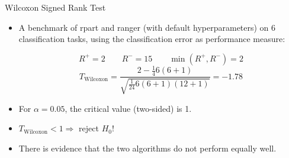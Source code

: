 \documentclass[11pt,compress,t,notes=noshow, xcolor=table]{beamer}
\begin{document}
\begin{frame}{Wilcoxon Signed Rank Test}
    \begin{itemize}
        \item A benchmark of rpart and ranger (with default hyperparameters) on 6 classification tasks, using the classification error as performance measure:
    {
        \scriptsize
        
    }

$$
    R^{+} = 2\qquad R^{-} = 15\qquad \min(R^{+}, R^{-}) = 2
    $$
    $$
    T_{\text{Wilcoxon}} = \frac{2 - \frac{1}{4}6(6 + 1)}{\sqrt{\frac{1}{24}6(6 + 1)(12 + 1)}} = - 1.78
    $$
    \item For $\alpha = 0.05$, the critical value (two-sided) is 1.
    \item $T_{\text{Wilcoxon}} < 1 \Rightarrow$ reject $H_0$!
    \item There is evidence that the two algorithms do not perform equally well.
\end{itemize}

\end{frame}
\end{document}
